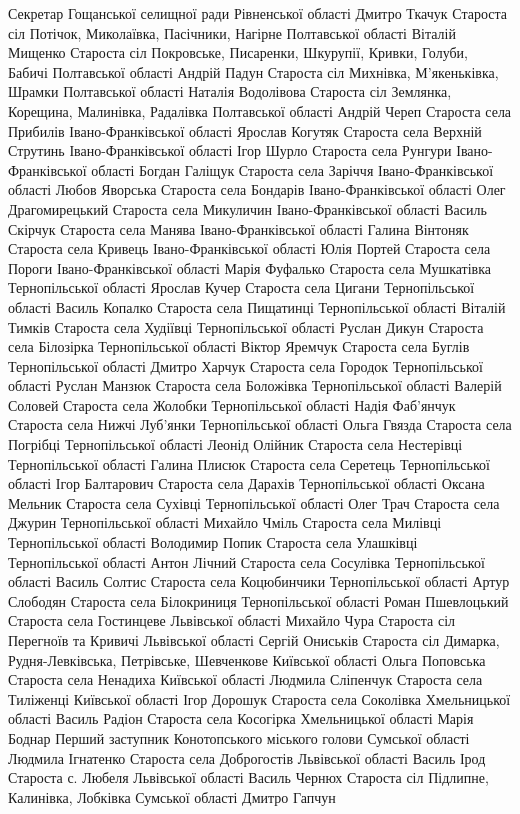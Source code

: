 Секретар Гощанської селищної ради Рівненської області Дмитро Ткачук 
Староста сіл Потічок, Миколаївка, Пасічники, Нагірне Полтавської області Віталій Мищенко
Староста сіл Покровське, Писаренки, Шкурупії, Кривки, Голуби, Бабичі Полтавської області Андрій Падун
Староста сіл Михнівка, М’якеньківка, Шрамки Полтавської області Наталія Водолівова 
Староста сіл Землянка, Корещина, Малинівка, Радалівка Полтавської області Андрій Череп
Староста села Прибилів Івано-Франківської області Ярослав Когутяк
Староста села Верхній Струтинь Івано-Франківської області Ігор Шурло
Староста села Рунгури Івано-Франківської області Богдан Галіщук
Староста села Заріччя Івано-Франківської області Любов Яворська
Староста села Бондарів Івано-Франківської області Олег Драгомирецький
Староста села Микуличин Івано-Франківської області Василь Скірчук
Староста села Манява Івано-Франківської області Галина Вінтоняк
Староста села Кривець Івано-Франківської області Юлія Портей
Староста села Пороги Івано-Франківської області Марія Фуфалько
Староста села Мушкатівка Тернопільської області Ярослав Кучер
Староста села Цигани Тернопільської області Василь Копалко
Староста села Пищатинці Тернопільської області Віталій Тимків
Староста села Худіївці Тернопільської області Руслан Дикун
Староста села Білозірка Тернопільської області Віктор Яремчук
Староста села Буглів Тернопільської області Дмитро Харчук
Староста села Городок Тернопільської області Руслан Манзюк
Староста села Боложівка Тернопільської області Валерій Соловей
Староста села Жолобки Тернопільської області Надія Фаб’янчук
Староста села Нижчі Луб’янки Тернопільської області Ольга Гвязда
Староста села Погрібці Тернопільської області Леонід Олійник
Староста села Нестерівці Тернопільської області Галина Плисюк
Староста села Серетець Тернопільської області Ігор Балтарович
Староста села Дарахів Тернопільської області Оксана Мельник
Староста села Сухівці Тернопільської області Олег Трач
Староста села Джурин Тернопільської області Михайло Чміль
Староста села Милівці Тернопільської області Володимир Попик
Староста села Улашківці Тернопільської області Антон Лічний
Староста села Сосулівка Тернопільської області Василь Солтис
Староста села Коцюбинчики Тернопільської області Артур Слободян
Староста села Білокриниця Тернопільської області Роман Пшевлоцький
Староста села Гостинцеве Львівської області Михайло Чура
Староста сіл Перегноїв та Кривичі Львівської області Сергій Ониськів
Староста сіл Димарка, Рудня-Левківська, Петрівське, Шевченкове Київської області Ольга Поповська
Староста села Ненадиха Київської області Людмила Сліпенчук
Староста села Тиліженці Київської області Ігор Дорошук
Староста села Соколівка Хмельницької області Василь Радіон
Староста села Косогірка Хмельницької області Марія Боднар
Перший заступник Конотопського міського голови Сумської області Людмила Ігнатенко
Староста села Доброгостів Львівської області Василь Ірод
Староста с. Любеля Львівської області Василь Чернюх 
Староста сіл Підлипне, Калинівка, Лобківка Сумської області Дмитро Гапчун
\restorecr

